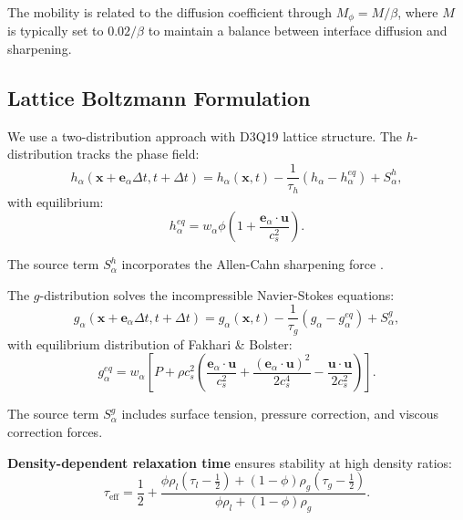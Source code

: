 The mobility is related to the diffusion coefficient through $M_\phi = M/\beta$, where $M$ is typically set to $0.02/\beta$ to maintain a balance between interface diffusion and sharpening.

\subsection{Lattice Boltzmann Formulation}

We use a two-distribution approach with D3Q19 lattice structure. The $h$-distribution tracks the phase field:
\begin{equation}
    h_\alpha (\mathbf{x} + \mathbf{e}_\alpha \Delta t, t + \Delta t) = h_\alpha (\mathbf{x}, t) - \frac{1}{\tau_h} \left( h_\alpha - h_\alpha^{eq} \right) + S_\alpha^h,
    \label{eq:h_evolution}
\end{equation}
with equilibrium:
\begin{equation}
    h_\alpha^{eq} = w_\alpha \phi \left( 1 + \frac{\mathbf{e}_\alpha \cdot \mathbf{u}}{c_s^2} \right).
    \label{eq:h_equilibrium}
\end{equation}

The source term $S_\alpha^h$ incorporates the Allen-Cahn sharpening force \cite{fakhari2017diffuse}.

The $g$-distribution solves the incompressible Navier-Stokes equations:
\begin{equation}
    g_\alpha (\mathbf{x} + \mathbf{e}_\alpha \Delta t, t + \Delta t) = g_\alpha (\mathbf{x}, t) - \frac{1}{\tau_g} \left( g_\alpha - g_\alpha^{eq} \right) + S_\alpha^g,
    \label{eq:g_evolution}
\end{equation}
with equilibrium distribution of Fakhari \& Bolster:
\begin{equation}
    g_\alpha^{eq} = w_\alpha \left[ P + \rho c_s^2 \left( \frac{\mathbf{e}_\alpha \cdot \mathbf{u}}{c_s^2} + \frac{(\mathbf{e}_\alpha \cdot \mathbf{u})^2}{2c_s^4} - \frac{\mathbf{u} \cdot \mathbf{u}}{2c_s^2} \right) \right].
    \label{eq:g_equilibrium}
\end{equation}

The source term $S_\alpha^g$ includes surface tension, pressure correction, and viscous correction forces.

\textbf{Density-dependent relaxation time} ensures stability at high density ratios:
\begin{equation}
    \tau_{\text{eff}} = \frac{1}{2} + \frac{\phi \rho_l (\tau_l - \tfrac{1}{2}) + (1-\phi) \rho_g (\tau_g - \tfrac{1}{2})}{\phi \rho_l + (1-\phi) \rho_g}.
    \label{eq:tau_eff}
\end{equation}

